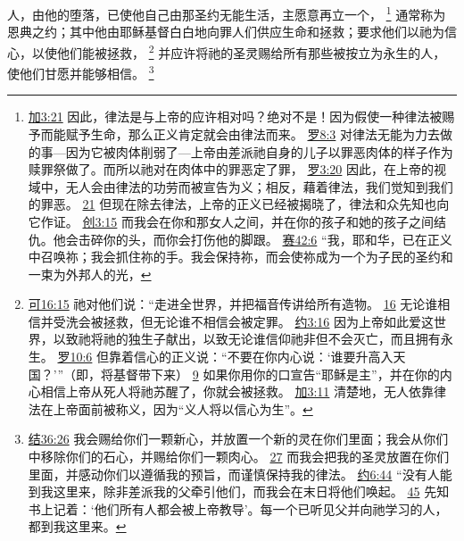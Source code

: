 \documentclass[12pt, a4paper, oneside]{ctexart}
\newcounter{parnum}[section]
\newcommand{\N}{%
   \noindent\refstepcounter{parnum}%
    \makebox[\parindent][l]{\textbf{\arabic{parnum}.}}}
\begin{document}
\N 人，由他的堕落，已使他自己由那圣约无能生活，主愿意再立一个，
	\footnote {
		\href{https://biblehub.com/galatians/3-21.htm}{加3:21} 因此，律法是与上帝的应许相对吗？绝对不是！因为假使一种律法被赐予而能赋予生命，那么正义肯定就会由律法而来。
		\href{https://biblehub.com/romans/8-3.htm}{罗8:3} 对律法无能为力去做的事---因为它被肉体削弱了---上帝由差派祂自身的儿子以罪恶肉体的样子作为赎罪祭做了。而所以祂对在肉体中的罪恶定了罪，
		\href{https://biblehub.com/romans/3-20.htm}{罗3:20} 因此，在上帝的视域中，无人会由律法的功劳而被宣告为义；相反，藉着律法，我们觉知到我们的罪恶。
		\href{https://biblehub.com/romans/3-21.htm}{21} 但现在除去律法，上帝的正义已经被揭晓了，律法和众先知也向它作证。
		\href{https://biblehub.com/genesis/3-15.htm}{创3:15} 而我会在你和那女人之间，并在你的孩子和她的孩子之间结仇。他会击碎你的头，而你会打伤他的脚跟。
		\href{https://biblehub.com/isaiah/42-6.htm}{赛42:6} “我，耶和华，已在正义中召唤祢；我会抓住祢的手。我会保持祢，而会使祢成为一个为子民的圣约和一束为外邦人的光，
	}
	通常称为恩典之约；其中他由耶稣基督白白地向罪人们供应生命和拯救；要求他们以祂为信心，以使他们能被拯救，
	\footnote {
		\href{https://biblehub.com/mark/16-15.htm}{可16:15} 祂对他们说：“走进全世界，并把福音传讲给所有造物。
		\href{https://biblehub.com/mark/16-16.htm}{16} 无论谁相信并受洗会被拯救，但无论谁不相信会被定罪。
		\href{https://biblehub.com/john/3-16.htm}{约3:16} 因为上帝如此爱这世界，以致祂将祂的独生子献出，以致无论谁信仰祂非但不会灭亡，而且拥有永生。
		\href{https://biblehub.com/romans/10-6.htm}{罗10:6} 但靠着信心的正义说：“不要在你内心说：‘谁要升高入天国？’”（即，将基督带下来）
		\href{https://biblehub.com/romans/10-9.htm}{9} 如果你用你的口宣告“耶稣是主”，并在你的内心相信上帝从死人将祂苏醒了，你就会被拯救。
		\href{https://biblehub.com/galatians/3-11.htm}{加3:11} 清楚地，无人依靠律法在上帝面前被称义，因为“义人将以信心为生”。
	}
	并应许将祂的圣灵赐给所有那些被按立为永生的人，使他们甘愿并能够相信。
	\footnote {
		\href{https://biblehub.com/ezekiel/36-26.htm}{结36:26} 我会赐给你们一颗新心，并放置一个新的灵在你们里面；我会从你们中移除你们的石心，并赐给你们一颗肉心。
		\href{https://biblehub.com/ezekiel/36-27.htm}{27} 而我会把我的圣灵放置在你们里面，并感动你们以遵循我的预旨，而谨慎保持我的律法。
		\href{https://biblehub.com/john/6-44.htm}{约6:44} “没有人能到我这里来，除非差派我的父牵引他们，而我会在末日将他们唤起。
		\href{https://biblehub.com/john/6-45.htm}{45} 先知书上记着：‘他们所有人都会被上帝教导’。每一个已听见父并向祂学习的人，都到我这里来。
	}
\end{document}
